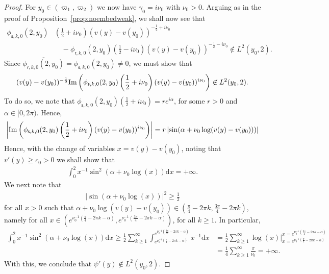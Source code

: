 \documentclass[11pt,reqno]{amsproc}
\theoremstyle{definition}
\numberwithin{equation}{section}
\newcommand{\sr}{{\mathsf{r}}}
\newcommand{\s}{{\mathsf{s}}}
\renewcommand{\d}{\mathrm{d}}
\def\Im{{\rm Im}}
\begin{document}
\begin{proof}
For $y_0\in (\varpi_1,\varpi_2)$ we now have $\gamma_0 = i\nu_0$ with $\nu_0>0$. Arguing as in the proof of Proposition~\ref{prop:noembedweak}, we shall now see that
\begin{align*}
 \phi_{\s,k,0}(2,y_0) &\left( \frac12+i\nu_0 \right)(v(y) - v(y_0))^{-\frac12+i\nu_0} \\
 &\quad - \phi_{\sr,k,0}(2,y_0) \left( \frac12-i\nu_0 \right)(v(y) - v(y_0))^{-\frac12-i\nu_0} \not \in L^2(y_0,2).
\end{align*}
Since $\overline{\phi_{\sr,k,0}(2,y_0)} = \phi_{\s,k,0}(2,y_0)\neq 0$, we must show that
\begin{align*}
    (v(y) - v(y_0))^{-\frac12}\Im \left( \phi_{\s,k,0}(2,y_0) \left( \frac12+i\nu_0 \right)(v(y) - v(y_0))^{i\nu_0} \right)\not \in L^2(y_0,2).
\end{align*}
To do so, we note that $\phi_{\s,k,0}(2,y_0) \left( \tfrac12+i\nu_0 \right)= re^{i\alpha}$, for some $r>0$ and $\alpha\in [0,2\pi)$. Hence, 
\begin{align*}
  \left| \Im \left( \phi_{\s,k,0}(2,y_0) \left( \frac12+i\nu_0 \right)(v(y) - v(y_0))^{i\nu_0} \right) \right| = r \left| \sin( \alpha  + \nu_0\log(v(y) - v(y_0))) \right|
\end{align*}
Hence, with the change of variables $x=v(y) - v(y_0)$, noting that $v'(y)\geq c_0>0$ we shall show that
\begin{align*}
\int_0^2 x^{-1}\sin^2(\alpha+\nu_0\log(x)) \d x = +\infty.   
\end{align*}
We next note that 
\begin{align*}
    \left| \sin( \alpha  + \nu_0\log(x)) \right|^2 \geq \frac12
\end{align*}
for all $x>0$ such that $\alpha + \nu_0\log(v(y) - v(y_0)) \in ( \frac{\pi}{4} - 2\pi k, \frac{3\pi}{4} - 2\pi k)$, namely for \newline
all $x\in (e^{\nu_0^{-1}(\frac{\pi}{4} - 2\pi k - \alpha)}, e^{\nu_0^{-1}(\frac{3\pi}{4} - 2\pi k - \alpha)} )$, for all $k\geq 1$. In particular,
\begin{align*}
    \int_0^2 x^{-1}\sin^2(\alpha+\nu_0\log(x)) \d x \geq \frac12\sum_{k\geq 1}^\infty \int_{e^{\nu_0^{-1}(\frac{\pi}{4} - 2\pi k - \alpha)}}^ {e^{\nu_0^{-1}(\frac{3\pi}{4} - 2\pi k - \alpha)}}x^{-1}\d x &= \frac12 \sum_{k\geq 1}^\infty \log(x) \Big|_{x=e^{\nu_0^{-1}(\frac{\pi}{4} - 2\pi k - \alpha)}}^{x=e^{\nu_0^{-1}(\frac{3\pi}{4} - 2\pi k - \alpha)}} \\
    &= \frac14 \sum_{k\geq 1}^{\infty} \frac{\pi}{\nu_0} = +\infty.
\end{align*}
With this, we conclude that $\psi'(y)\not \in L^2(y_0,2)$.
\end{proof}
\end{document}
